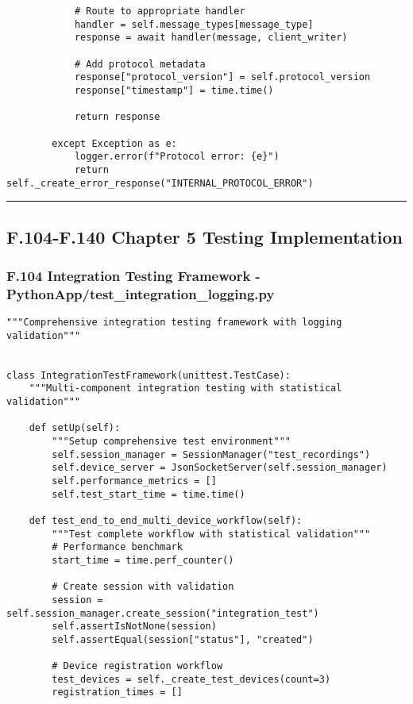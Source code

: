 \documentclass[12pt,a4paper]{report}
\begin{document}
{{\begin{verbatim}
            # Route to appropriate handler
            handler = self.message_types[message_type]
            response = await handler(message, client_writer)

            # Add protocol metadata
            response["protocol_version"] = self.protocol_version
            response["timestamp"] = time.time()

            return response

        except Exception as e:
            logger.error(f"Protocol error: {e}")
            return self._create_error_response("INTERNAL_PROTOCOL_ERROR")
\end{verbatim}

\hrule

\subsection{F.104-F.140 Chapter 5 Testing Implementation}

\subsubsection{F.104 Integration Testing Framework - PythonApp/test_integration_logging.py}

\begin{verbatim}
"""Comprehensive integration testing framework with logging validation"""


class IntegrationTestFramework(unittest.TestCase):
    """Multi-component integration testing with statistical validation"""

    def setUp(self):
        """Setup comprehensive test environment"""
        self.session_manager = SessionManager("test_recordings")
        self.device_server = JsonSocketServer(self.session_manager)
        self.performance_metrics = []
        self.test_start_time = time.time()

    def test_end_to_end_multi_device_workflow(self):
        """Test complete workflow with statistical validation"""
        # Performance benchmark
        start_time = time.perf_counter()

        # Create session with validation
        session = self.session_manager.create_session("integration_test")
        self.assertIsNotNone(session)
        self.assertEqual(session["status"], "created")

        # Device registration workflow
        test_devices = self._create_test_devices(count=3)
        registration_times = []


\end{verbatim}}}
\end{document}
